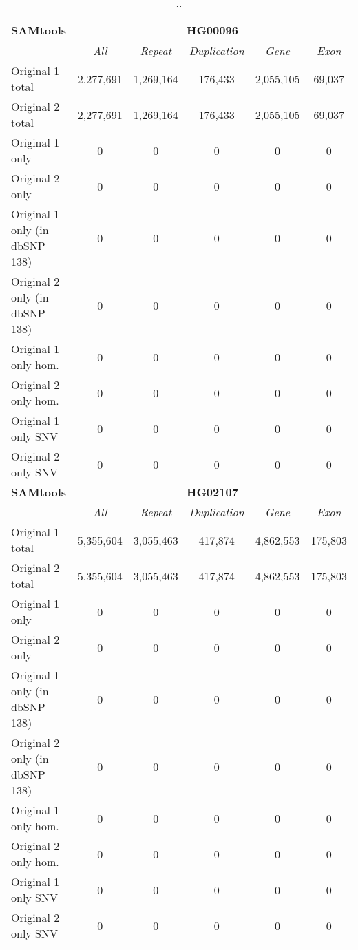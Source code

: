 \begin{table}[htb]
\caption{ .. }
\begin{center}
\begin{tabular}{|l|c||c|c|c|c|}
\hline
{\bf SAMtools} & \multicolumn{5}{|c|}{\bf HG00096} \\
\hline
\cline{2-6}
{\bf} & {\it All} & {\it Repeat} & {\it Duplication} & {\it Gene} & {\it Exon} \\
\hline
Original 1 total & 2,277,691 & 1,269,164 & 176,433 & 2,055,105 & 69,037 \\
\hline
Original 2 total & 2,277,691 & 1,269,164 & 176,433 & 2,055,105 & 69,037 \\
\hline
Original 1 only & 0 & 0 & 0 & 0 & 0\\ 
\hline
Original 2 only & 0 & 0 & 0 & 0 & 0\\ 
\hline
Original 1 only (in dbSNP 138) & 0 & 0 & 0 & 0 & 0\\ 
\hline
Original 2 only (in dbSNP 138) & 0 & 0 & 0 & 0 & 0\\ 
\hline
Original 1 only hom. & 0 & 0 & 0 & 0 & 0\\ 
\hline
Original 2 only hom. & 0 & 0 & 0 & 0 & 0\\ 
\hline
Original 1 only SNV & 0 & 0 & 0 & 0 & 0\\ 
\hline
Original 2 only SNV & 0 & 0 & 0 & 0 & 0\\ 
\hline
\hline
{\bf SAMtools} & \multicolumn{5}{|c|}{\bf HG02107} \\
\hline
\cline{2-6}
{\bf} & {\it All} & {\it Repeat} & {\it Duplication} & {\it Gene} & {\it Exon} \\
\hline
Original 1 total & 5,355,604 & 3,055,463 & 417,874 & 4,862,553 & 175,803 \\
\hline
Original 2 total & 5,355,604 & 3,055,463 & 417,874 & 4,862,553 & 175,803 \\
\hline
Original 1 only & 0 & 0 & 0 & 0 & 0\\ 
\hline
Original 2 only & 0 & 0 & 0 & 0 & 0\\ 
\hline
Original 1 only (in dbSNP 138) & 0 & 0 & 0 & 0 & 0\\ 
\hline
Original 2 only (in dbSNP 138) & 0 & 0 & 0 & 0 & 0\\ 
\hline
Original 1 only hom. & 0 & 0 & 0 & 0 & 0\\ 
\hline
Original 2 only hom. & 0 & 0 & 0 & 0 & 0\\ 
\hline
Original 1 only SNV & 0 & 0 & 0 & 0 & 0\\ 
\hline
Original 2 only SNV & 0 & 0 & 0 & 0 & 0\\ 
\hline
\end{tabular}
\end{center}
\label{tab:orig-vs-orig2-samtools}
\end{table}

